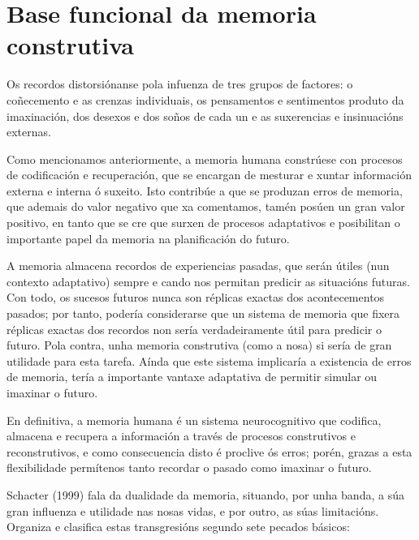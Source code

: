 \documentclass[a4paper,11pt]{article}
\begin{document}
\section{Base funcional da memoria construtiva}
Os recordos distorsiónanse pola infuenza de tres grupos de factores: o coñecemento e as crenzas individuais, os pensamentos e sentimentos produto da imaxinación, dos desexos e dos soños de cada un e as suxerencias e insinuacións externas.

Como mencionamos anteriormente, a memoria humana constrúese con procesos de codificación e recuperación, que se encargan de mesturar e xuntar información externa e interna ó suxeito. Isto contribúe a que se produzan erros de memoria, que ademais do valor negativo que xa comentamos, tamén posúen un gran valor positivo, en tanto que se cre que surxen de procesos adaptativos e posibilitan o importante papel da memoria na planificación do futuro.

A memoria almacena recordos de experiencias pasadas, que serán útiles (nun contexto adaptativo) sempre e cando nos permitan predicir as situacións futuras. Con todo, os sucesos futuros nunca son réplicas exactas dos acontecementos pasados; por tanto, podería considerarse que un sistema de memoria que fixera réplicas exactas dos recordos non sería verdadeiramente útil para predicir o futuro. Pola contra, unha memoria construtiva (como a nosa) si sería de gran utilidade para esta tarefa. Aínda que este sistema implicaría a existencia de erros de memoria, tería a importante vantaxe adaptativa de permitir simular ou imaxinar o futuro. 

En definitiva, a memoria humana é un sistema neurocognitivo que codifica, almacena e recupera a información a través de procesos construtivos e reconstrutivos, e como consecuencia disto é proclive ós erros; porén, grazas a esta flexibilidade permítenos tanto recordar o pasado como imaxinar o futuro.

Schacter (1999) fala da dualidade da memoria, situando, por unha banda, a súa gran influenza e utilidade nas nosas vidas, e por outro, as súas limitacións. Organiza e clasifica estas transgresións segundo sete pecados básicos:
\end{document}
